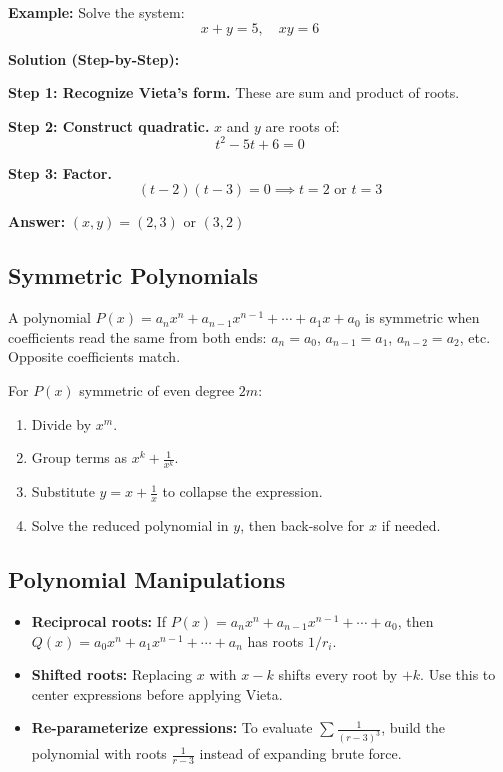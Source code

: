 \documentclass[12pt]{extarticle}
\begin{document}
\begin{examplebox}
\textbf{Example:} Solve the system:
\[
x + y = 5, \quad xy = 6
\]

\textbf{Solution (Step-by-Step):}

\textbf{Step 1: Recognize Vieta's form.} These are sum and product of roots.

\textbf{Step 2: Construct quadratic.} $x$ and $y$ are roots of:
\[
t^2 - 5t + 6 = 0
\]

\textbf{Step 3: Factor.}
\[
(t-2)(t-3) = 0 \implies t = 2 \text{ or } t = 3
\]

\textbf{Answer:} $\boxed{(x,y) = (2,3) \text{ or } (3,2)}$
\end{examplebox}

\subsection{Symmetric Polynomials}

\begin{conceptbox}
A polynomial $P(x) = a_n x^n + a_{n-1}x^{n-1} + \cdots + a_1x + a_0$ is symmetric when coefficients read the same from both ends: $a_n = a_0$, $a_{n-1} = a_1$, $a_{n-2} = a_2$, etc. Opposite coefficients match.
\end{conceptbox}

\begin{conceptbox}
For $P(x)$ symmetric of even degree $2m$:
\begin{enumerate}
    \item Divide by $x^m$.
    \item Group terms as $x^k + \tfrac{1}{x^k}$.
    \item Substitute $y = x + \tfrac{1}{x}$ to collapse the expression.
    \item Solve the reduced polynomial in $y$, then back-solve for $x$ if needed.
\end{enumerate}
\end{conceptbox}

\subsection{Polynomial Manipulations}

\begin{conceptbox}
\begin{itemize}
    \item \textbf{Reciprocal roots:} If $P(x) = a_n x^n + a_{n-1}x^{n-1} + \cdots + a_0$, then $Q(x) = a_0 x^n + a_1 x^{n-1} + \cdots + a_n$ has roots $1/r_i$.
    \item \textbf{Shifted roots:} Replacing $x$ with $x-k$ shifts every root by $+k$. Use this to center expressions before applying Vieta.
    \item \textbf{Re-parameterize expressions:} To evaluate $\sum \tfrac{1}{(r-3)^3}$, build the polynomial with roots $\tfrac{1}{r-3}$ instead of expanding brute force.
\end{itemize}
\end{conceptbox}
\end{document}

